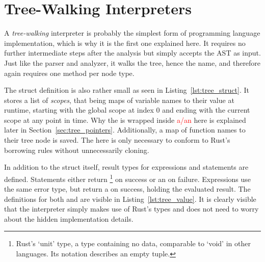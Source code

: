 \section{Tree-Walking Interpreters}
A \emph{tree-walking} interpreter is probably the simplest form of programming language implementation, which is why it is the first one explained here.
It requires no further intermediate steps after the analysis but simply accepts the AST as input.
Just like the parser and analyzer, it walks the tree, hence the name, and therefore again requires one method per node type.

The struct definition is also rather small as seen in Listing~\ref{lst:tree_struct}.
It stores a list of \emph{scopes}, that being maps of variable names to their value at runtime, starting with the global scope at index 0 and ending with the current scope at any point in time.
Why the  is wrapped inside \textcolor{red}{a/an}  here is explained later in Section~\ref{sec:tree_pointers}.
Additionally, a map of function names to their tree node is saved.
The  here is only necessary to conform to Rust's borrowing rules without unnecessarily cloning.


In addition to the struct itself, result types for expressions and statements are defined.
Statements either return \qVerb{()}\footnote{Rust's `unit' type, a type containing no data, comparable to `void' in other languages. Its notation describes an empty tuple.} on success or an  on failure.
Expressions use the same error type, but return a  on success, holding the evaluated result.
The definitions for both  and  are visible in Listing~\ref{lst:tree_value}.
It is clearly visible that the interpreter simply makes use of Rust's types and does not need to worry about the hidden implementation details.



